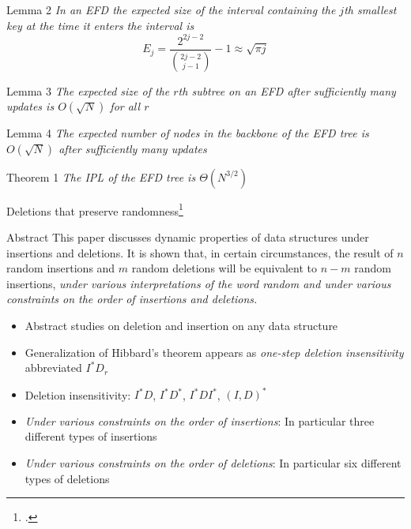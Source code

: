 \documentclass{beamer}
\begin{document}
\begin{frame}
    \pause
    \begin{alertblock}{Lemma 2}
        \textit{In an EFD the expected size of the interval containing the $j$th smallest key at the time it enters the interval is}
        $$
        E_j = \frac{2^{2j - 2}}{\binom{2j - 2}{j - 1}} - 1 \approx \sqrt{\pi j}
        $$
    \end{alertblock}
    \pause
    \begin{alertblock}{Lemma 3}
        \textit{The expected size of the $r$th subtree on an EFD after sufficiently many updates is $O(\sqrt{N})$ for all $r$}
    \end{alertblock}
    \pause
    \begin{alertblock}{Lemma 4}
        \textit{The expected number of nodes in the backbone of the EFD tree is $O(\sqrt{N})$ after sufficiently many updates}
    \end{alertblock}
\end{frame}
\begin{frame}
    \begin{alertblock}{Theorem 1}
        \textit{The IPL of the EFD tree is $\Theta(N^{3/2})$}
    \end{alertblock}
\end{frame}



\begin{frame}{Deletions that preserve randomness\footcite{knuth1977deletions}}
    \begin{block}{Abstract}
        This paper discusses dynamic properties of data structures under
        insertions and deletions. It is shown that, in certain circumstances,
        the result of $n$ random insertions and $m$ random deletions will be
        equivalent to $n-m$ random insertions, \textit{under various interpretations of
        the word \textit{random} and under various constraints on the order of insertions
    and deletions.}
    \end{block}
\end{frame}

\begin{frame}
    \begin{itemize}
        \item Abstract studies on deletion and insertion on any data structure
            \pause
        \item Generalization of Hibbard's theorem appears as \textit{one-step deletion insensitivity} abbreviated $I^* D_r$
            \pause
        \item Deletion insensitivity: $I^*D$, $I^*D^*$, $I^*DI^*$, $(I,D)^*$
            \pause
        \item \textit{Under various constraints on the order of insertions}: In particular three different types of insertions
        \item \textit{Under various constraints on the order of deletions}: In particular six different types of deletions
    \end{itemize}
\end{frame}
\end{document}
